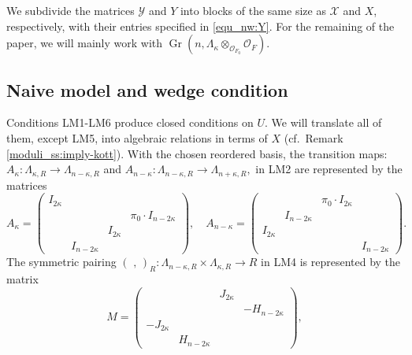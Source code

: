 \documentclass[pdflatex,sn-mathphys-num]{sn-jnl}%
\theoremstyle{thmstyleone}%
\theoremstyle{thmstyletwo}%
\numberwithin{equation}{subsection}
\theoremstyle{thmstylethree}%
\newcommand{\CO}{\ensuremath{\mathcal{O}}\xspace}
\newcommand{\CX}{\ensuremath{\mathcal{X}}\xspace}
\newcommand{\CY}{\ensuremath{\mathcal{Y}}\xspace}
\DeclareMathOperator{\Gr}{Gr}
\newcommand{\sform}{\ensuremath{(\text{~,~})}\xspace}
\begin{document}
We subdivide the matrices $\CY$ and $Y$ into blocks of the same size as $\CX$ and $X$, respectively, with their entries specified in \eqref{equ_nw:Y}. 
For the remaining of the paper, we will mainly work with $\Gr(n,\Lambda_\kappa\otimes_{\CO_{F_0}}\CO_F)$. 
		
		
\subsection{Naive model and wedge condition}\label{equ_nw}
Conditions {\selectfont LM1}-{\selectfont LM6} produce closed conditions on $U$. We will translate all of them, except {\selectfont LM5}, into algebraic relations in terms of $X$ (cf.\ Remark \ref{moduli_ss:imply-kott}).
With the chosen reordered basis, the transition maps:
$A_{\kappa}: \Lambda_{\kappa,R}\rightarrow \Lambda_{n-\kappa,R}$
and
$A_{n-\kappa}: \Lambda_{n-\kappa,R}\rightarrow \Lambda_{n+\kappa,R},$
in {\selectfont LM2} are represented by the matrices
\begin{equation}\label{equ_nw:trans}
	A_{\kappa}=\left(\begin{matrix}
	I_{2\kappa}    &          &          &   \\
	&          &          &   \pi_0\cdot I_{n-2\kappa}\\
	&          &   I_{2\kappa}&   \\
	&   I_{n-2\kappa}  &          &   
\end{matrix}\right),
\quad
A_{n-\kappa}=\left(
\begin{matrix}
	&          &   \pi_0 \cdot I_{2\kappa}      &   \\
	&   I_{n-2\kappa}  &          &   \\
	I_{2\kappa}    &          &          &   \\
	&          &          &I_{n-2\kappa}
\end{matrix}\right).
\end{equation}
The symmetric pairing $\sform_R:\Lambda_{n-\kappa,R}\times \Lambda_{\kappa,R}\rightarrow R$ in {\selectfont LM4} is represented by the matrix
\begin{equation}\label{equ_nw:M}
	M=\left(\begin{matrix}
	&      &J_{2\kappa}&  \\
	&      &       &-H_{n-2\kappa}\\
	-J_{2\kappa}   &      &       &\\
	&H_{n-2\kappa} &       &
    \end{matrix}\right),
\end{equation}
\end{document}
